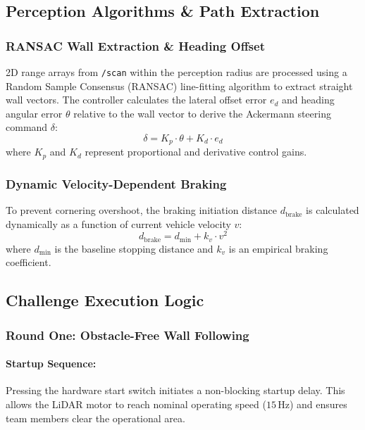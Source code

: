 \documentclass[12pt,a4paper]{article}
\begin{document}
\subsection{Perception Algorithms \& Path Extraction}

\subsubsection{RANSAC Wall Extraction \& Heading Offset}
2D range arrays from \texttt{/scan} within the perception radius are processed using a Random Sample Consensus (RANSAC) line-fitting algorithm to extract straight wall vectors. The controller calculates the lateral offset error $e_d$ and heading angular error $\theta$ relative to the wall vector to derive the Ackermann steering command $\delta$:
\begin{equation}
\delta = K_p \cdot \theta + K_d \cdot e_d
\end{equation}
where $K_p$ and $K_d$ represent proportional and derivative control gains.

\subsubsection{Dynamic Velocity-Dependent Braking}
To prevent cornering overshoot, the braking initiation distance $d_{\text{brake}}$ is calculated dynamically as a function of current vehicle velocity $v$:
\begin{equation}
d_{\text{brake}} = d_{\text{min}} + k_v \cdot v^2
\end{equation}
where $d_{\text{min}}$ is the baseline stopping distance and $k_v$ is an empirical braking coefficient.

\subsection{Challenge Execution Logic}

\subsubsection{Round One: Obstacle-Free Wall Following}
\paragraph{Startup Sequence:} Pressing the hardware start switch initiates a non-blocking startup delay. This allows the LiDAR motor to reach nominal operating speed ($15\,\text{Hz}$) and ensures team members clear the operational area.
\end{document}
